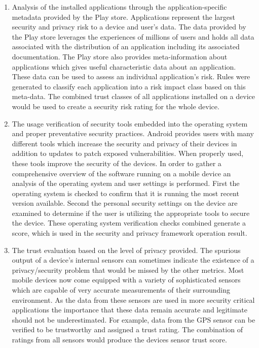 \begin{enumerate}
\item Analysis of the installed applications through the application-specific metadata provided by the Play store. Applications represent the largest security and privacy risk to a device and user's data. The data provided by the Play store leverages the experiences of millions of users and holds all data associated with the distribution of an application including its associated documentation. The Play store also provides meta-information about applications which gives useful characteristic data about an application. These data can be used to assess an individual application's risk. Rules were generated to classify each application into a risk impact class based on this meta-data. The combined trust classes of all applications installed on a device would be used to create a security risk rating for the whole device.

\item The usage verification of security tools embedded into the operating system and proper preventative security practices. Android provides users with many different tools which increase the security and privacy of their devices in addition to updates to patch exposed vulnerabilities. When properly used, these tools improve the security of the devices. In order to gather a comprehensive overview of the software running on a mobile device an analysis of the operating system and user settings is performed. First the operating system is checked to confirm that it is running the most recent version available. Second the personal security settings on the device are examined to determine if the user is utilizing the appropriate tools to secure the device. These operating system verification checks combined generate a score, which is used in the security and privacy framework operation result.

\item The trust evaluation based on the level of privacy provided.  
The spurious output of a device's internal sensors can sometimes indicate the existence of a privacy/security problem 
that would be missed by the other metrics. Most mobile devices now come equipped with a variety of sophisticated sensors which are capable of very accurate measurements of their surrounding environment. 
As the data from these sensors are used in more security critical applications the importance that these data remain accurate and legitimate should not be underestimated. For example, data from the GPS sensor can be verified to be trustworthy and assigned a trust rating. The combination of ratings from all sensors would produce the devices sensor trust score.
\end{enumerate}


